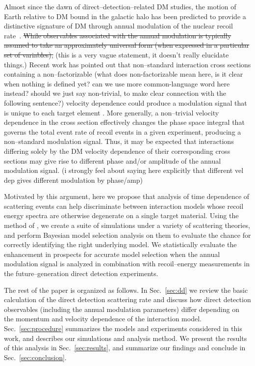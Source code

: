 \documentclass[11pt]{article}
\newcommand{\Sec}[1]{Sec.~\ref{#1}} \newcommand{\Secs}[2]{Secs.~\ref{#1} and \ref{#2}} \newcommand{\Secm}[2]{Secs.~\ref{#1} through \ref{#2}}
\newcommand{\vgColor}{magenta}
\newcommand{\vg}[1]{{\color{\vgColor} #1}}
\begin{document}
Almost since the dawn of direct--detection--related DM studies, the motion of Earth relative to DM bound in the galactic halo has been predicted to provide a distinctive signature of DM through annual modulation of the nuclear recoil rate~\cite{Freese:1987wu, Freese:2012xd,Lee:2013xxa,Britto:2014wga,DelNobile:2015nua,Kouvaris:2015xga}. \vg{\st{While observables associated with the annual modulation is typically assumed to take an approximately universal form (when expressed in a particular set of variables),}}\vg{(this is a very vague statement, it doesn't really elucidate things.)} Recent work has pointed out that non--standard interaction cross sections containing a non--factorizable \vg{(what does non-factorizable mean here, is it clear when nothing is defined yet? can we use more common-language word here instead? should we just say non-trivial, to make clear connection with the following sentence?)} velocity dependence could produce a modulation signal that is unique to each target element \cite{DelNobile:2015tza,DelNobile:2015rmp}. More generally, a non--trivial velocity dependence in the cross section effectively changes the phase space integral that governs the total event rate of recoil events in a given experiment, producing a non--standard modulation signal. Thus, it may be expected that interactions differing solely by the DM velocity dependence of their corresponding cross sections may give rise to different phase and/or amplitude of the annual modulation signal. \vg{(i strongly feel about saying here explicitly that different vel dep gives different modulation by phase/amp)}

Motivated by this argument, here we propose that analysis of time dependence of scattering events can help discriminate between interaction models whose recoil energy spectra are otherwise degenerate on a single target material. Using the method of \cite{Gluscevic:2015sqa}, we create a suite of simulations under a variety of scattering theories, and perform Bayesian model selection analysis on them to evaluate the chance for correctly identifying the right underlying model. We statistically evaluate the enhancement in prospects for accurate model selection when the annual modulation signal is analyzed in combination with recoil--energy measurements in the future--generation direct detection experiments. 

The rest of the paper is organized as follows. In \Sec{sec:dd} we review the basic calculation of the direct detection scattering rate and discuss how direct detection observables (including the annual modulation parameters) differ depending on the momentum and velocity dependence of the interaction model. \Sec{sec:procedure} summarizes the models and experiments considered in this work, and describes our simulations and analysis method. We present the results of this analysis in \Sec{sec:results}, and summarize our findings and conclude in \Sec{sec:conclusion}.
\end{document}
